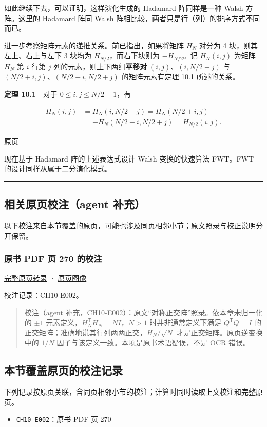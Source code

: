 \documentclass[
  10pt,
  fontset=fandol]{ctexart}
\providecommand{\tightlist}{%
  \setlength{\itemsep}{0pt}\setlength{\parskip}{0pt}}
\begin{document}
如此继续下去，可以证明，这样演化生成的 Hadamard 阵同样是一种 Walsh 方阵。这里的 Hadamard 阵同 Walsh 阵相比较，两者只是行（列）的排序方式不同而已。

进一步考察矩阵元素的递推关系。前已指出，如果将矩阵 \(H_N\) 对分为 4 块，则其左上、右上与左下 3 块均为 \(H_{N/2}\)，而右下块则为 \(-H_{N/2}\)。记 \(H_N(i,j)\) 为矩阵 \(H_N\) 第 \(i\) 行第 \(j\) 列的元素，则上下两组\textbf{平移对} \((i,j)\)、\((i,N/2+j)\) 与 \((N/2+i,j)\)、\((N/2+i,N/2+j)\) 的矩阵元素有定理 10.1 所述的关系。

\textbf{定理 10.1}　对于 \(0\leqslant i,j\leqslant N/2-1\)，有

\[
\begin{aligned}
H_N(i,j)&=H_N(i,N/2+j)=H_N(N/2+i,j)\\
&=-H_N(N/2+i,N/2+j)=H_{N/2}(i,j).
\end{aligned}
\]

\href{../../source-images/pdf-270.jpeg}{原页}

现在基于 Hadamard 阵的上述表达式设计 Walsh 变换的快速算法 FWT。FWT 的设计同样从属于二分演化模式。

\begin{center}\rule{0.5\linewidth}{0.5pt}\end{center}

\subsection{相关原页校注（agent 补充）}\label{ux76f8ux5173ux539fux9875ux6821ux6ce8agent-ux8865ux5145}

以下校注来自本节覆盖的原页，可能也涉及同页相邻小节；原文照录与校正说明分开保留。

\subsubsection{原书 PDF 页 270 的校注}\label{ux539fux4e66-pdf-ux9875-270-ux7684ux6821ux6ce8}

\href{../pages/pdf-270.md}{完整原页转录} · \href{../../source-images/pdf-270.jpeg}{原页图像}

校注记录：CH10-E002。

\begin{quote}
校注（agent 补充，CH10-E002）：原文``对称正交阵''照录。依本章未归一化的 \(\pm1\) 元素定义，\(H_N^\mathsf{T}H_N=NI\)，\(N>1\) 时并非通常定义下满足 \(Q^\mathsf{T}Q=I\) 的正交矩阵；准确地说其行列两两正交，\(H_N/\sqrt N\) 才是正交矩阵。原页逆变换中的 \(1/N\) 因子与该定义一致。本项是原书术语疑误，不是 OCR 错误。
\end{quote}

\subsection{本节覆盖原页的校注记录}\label{ux672cux8282ux8986ux76d6ux539fux9875ux7684ux6821ux6ce8ux8bb0ux5f55}

下列记录按原页关联，含同页相邻小节的校注；计算时同时读取上文校注和完整原页。

\begin{itemize}
\tightlist
\item
  \texttt{CH10-E002}：原书 PDF 页 270
\end{itemize}
\end{document}
